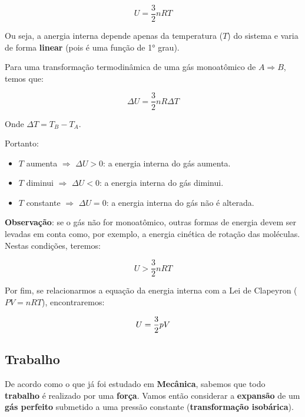 \documentclass[12pt]{article}
\begin{document}
\begin{equation}\label{eq:energiainterna}
    U=\dfrac{3}{2}nRT
\end{equation}


Ou seja, a anergia interna depende apenas da temperatura (\textbf{$T$}) do sistema e varia de forma \textbf{linear} (pois é uma função de 1° grau).


Para uma transformação termodinâmica de uma gás monoatômico de $A\Rightarrow B$, temos que:


\begin{equation*}
    \Delta U = \dfrac{3}{2}nR\Delta T
\end{equation*}


Onde $\Delta T = T_{B}-T_{A}$.


Portanto:


\begin{itemize}

\item \textbf{$T$} aumenta $\Rightarrow$ \textbf{$\Delta U > 0$}: a energia interna do gás aumenta.

\item \textbf{$T$} diminui $\Rightarrow$ \textbf{$\Delta U < 0$}: a energia interna do gás diminui.

\item \textbf{$T$} constante $\Rightarrow$ \textbf{$\Delta U = 0$}: a energia interna do gás não é alterada.

\end{itemize}


\textbf{Observação}: se o gás não for monoatômico, outras formas de energia devem ser levadas em conta como, por exemplo, a energia cinética de rotação das moléculas. Nestas condições, teremos:


\begin{equation*}
    U > \dfrac{3}{2}nRT
\end{equation*}


Por fim, se relacionarmos a equação da energia interna com a Lei de Clapeyron ($PV = nRT$), encontraremos:


\begin{equation}
    U = \dfrac{3}{2}pV\\
\end{equation}


\hypertarget{x-trabalho}{\subsection{Trabalho}}
De acordo como o que já foi estudado em \textbf{Mecânica}, sabemos que todo \textbf{trabalho} é realizado por uma \textbf{força}. Vamos então considerar a \textbf{expansão} de um \textbf{gás perfeito} submetido a uma pressão constante (\textbf{transformação isobárica}).
\end{document}
